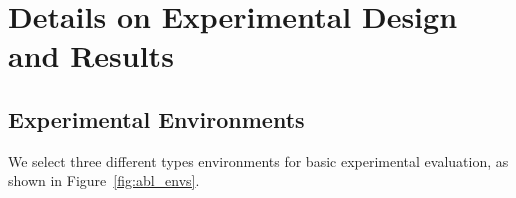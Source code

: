 


\section{Details on Experimental Design and Results}
\label{Details on Experimental Design and Results}

\subsection{Experimental Environments}
\label{Experimental environments}
We select three different types environments for basic experimental evaluation, as shown in Figure~\ref{fig:abl_envs}. 

